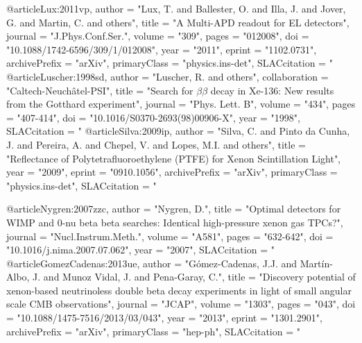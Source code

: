@article{Lux:2011vp,
      author         = "Lux, T. and Ballester, O. and Illa, J. and Jover, G. and
                        Martin, C. and others",
      title          = "{A Multi-APD readout for EL detectors}",
      journal        = "J.Phys.Conf.Ser.",
      volume         = "309",
      pages          = "012008",
      doi            = "10.1088/1742-6596/309/1/012008",
      year           = "2011",
      eprint         = "1102.0731",
      archivePrefix  = "arXiv",
      primaryClass   = "physics.ins-det",
      SLACcitation   = "%
}
@article{Luscher:1998sd,
      author         = "Luscher, R. and others",
      collaboration  = "{Caltech-Neuch\^{a}tel-PSI}",
      title          = "{Search for $\beta\beta$ decay in Xe-136: New results from
                        the Gotthard experiment}",
      journal        = "Phys. Lett. B",
      volume         = "434",
      pages          = "407-414",
      doi            = "10.1016/S0370-2693(98)00906-X",
      year           = "1998",
      SLACcitation   = "%
}
@article{Silva:2009ip,
      author         = "Silva, C. and Pinto da Cunha, J. and Pereira, A. and
                        Chepel, V. and Lopes, M.I. and others",
      title          = "{Reflectance of Polytetrafluoroethylene (PTFE) for Xenon
                        Scintillation Light}",
      year           = "2009",
      eprint         = "0910.1056",
      archivePrefix  = "arXiv",
      primaryClass   = "physics.ins-det",
      SLACcitation   = "%
}

@article{Nygren:2007zzc,
      author         = "Nygren, D.",
      title          = "{Optimal detectors for WIMP and 0-nu beta beta searches:
                        Identical high-pressure xenon gas TPCs?}",
      journal        = "Nucl.Instrum.Meth.",
      volume         = "A581",
      pages          = "632-642",
      doi            = "10.1016/j.nima.2007.07.062",
      year           = "2007",
      SLACcitation   = "%
}
@article{GomezCadenas:2013ue,
      author         = "G\'omez-Cadenas, J.J. and Mart\'in-Albo, J. and Munoz Vidal,
                        J. and Pena-Garay, C.",
      title          = "{Discovery potential of xenon-based neutrinoless double
                        beta decay experiments in light of small angular scale CMB
                        observations}",
      journal        = "JCAP",
      volume         = "1303",
      pages          = "043",
      doi            = "10.1088/1475-7516/2013/03/043",
      year           = "2013",
      eprint         = "1301.2901",
      archivePrefix  = "arXiv",
      primaryClass   = "hep-ph",
      SLACcitation   = "%
}

